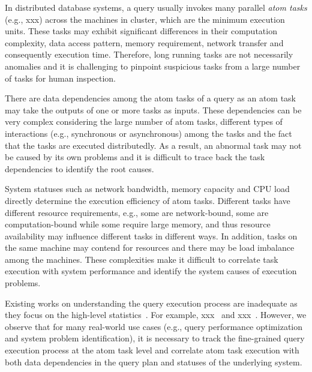  In distributed database systems, a query usually invokes many parallel \textit{atom tasks} (e.g., xxx) across the machines in cluster, which are the minimum execution units. These tasks may exhibit significant differences in their computation complexity, data access pattern, memory requirement, network transfer and consequently execution time. Therefore, long running tasks are not necessarily anomalies and it is challenging to pinpoint suspicious tasks from a large number of tasks for human inspection.        


 There are data dependencies among the atom tasks of a query as an atom task may take the outputs of one or more tasks as inputs. These dependencies can be very complex considering the large number of atom tasks, different types of interactions (e.g., synchronous or asynchronous) among the tasks and the fact that the tasks are executed distributedly. As a result, an abnormal task may not be caused by its own problems and it is difficult to trace back the task dependencies to identify the root causes.  



 System statuses such as network bandwidth, memory capacity and CPU load directly determine the execution efficiency of atom tasks. Different tasks have different resource requirements, e.g., some are network-bound, some are computation-bound while some require large memory, and thus resource availability may influence different tasks in different ways. In addition, tasks on the same machine may contend for resources and there may be load imbalance among the machines. These complexities make it difficult to correlate task execution with system performance and identify the system causes of execution problems.     


Existing works on understanding the query execution process are inadequate as they focus on the high-level statistics~\cite{}. For example, xxx~\cite{} and xxx~\cite{}. However, we observe that for many real-world use cases (e.g., query performance optimization and system problem identification), it is necessary to track the fine-grained query execution process at the atom task level and correlate atom task execution with both data dependencies in the query plan and statuses of the underlying system.           



